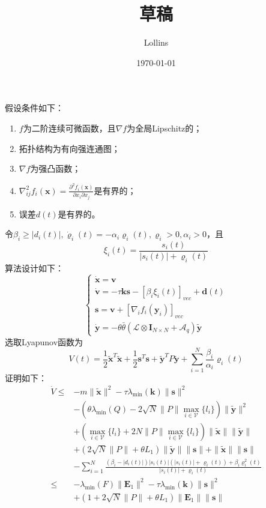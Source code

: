 \documentclass[12pt, a4paper, oneside]{ctexbook}
\title{{\Huge{\textbf{草稿}}}}
\author{Lollins}
\date{\today}
\begin{document}
\setcounter{page}{1}

\setcounter{page}{1}

假设条件如下：
\begin{enumerate}
    \item $f$为二阶连续可微函数，且$\nabla f$为全局Lipschitz的；
    \item 拓扑结构为有向强连通图；
    \item $\nabla f$为强凸函数；
    \item $\nabla_{ij}^{2}f_{i}(\mathbf{x})=\frac{\partial^{2}f_{i}(\mathbf{x})}{\partial x_{i}\partial x_{j}}$是有界的；
    \item 误差$d(t)$是有界的。
\end{enumerate}
令$\beta_i \geq | d_i(t) |, \dot{\varrho}_i(t) = -\alpha_i \varrho_i(t), \varrho_i > 0, \alpha_i > 0$，且
$$
\xi_i(t) = \frac{s_i(t)}{|s_i(t)| + \varrho_i(t)}
$$
算法设计如下：
$$
\begin{cases}
    \dot{\mathbf{x}}=\mathbf{v}\\
    \dot{\mathbf{v}}=-\tau\mathbf{k}\mathbf{s}-[\beta_i\xi_i(t)]_{vec}+\mathbf{d}(t)\\
    \mathbf{s}=\mathbf{v}+[\nabla_if_i(\mathbf{y}_i)]_{vec}\\
    \dot{\mathbf{y}}=-\theta\bar{\theta}(\mathcal{L}\otimes\mathbf{I}_{N\times N}+\mathcal{A}_q)\tilde{\mathbf{y}}
\end{cases}
$$
选取Lyapunov函数为
$$
V(t) = \frac{1}{2}\tilde{\mathbf{x}}^{T}\tilde{\mathbf{x}}+\frac{1}{2}\mathbf{s}^{T}\mathbf{s}+\tilde{\mathbf{y}}^{T}P\tilde{\mathbf{y}} + \sum_{i = 1}^{N} \frac{\beta_i}{\alpha_i}\varrho_i(t) 
$$
证明如下：
$$
\begin{aligned}
    \dot{V}\leq & -m\|\tilde{\mathbf{x}}\|^2-\tau\lambda_{\min}(\mathbf{k})\|\mathbf{s}\|^2  \\
    &-(\theta\lambda_{\min}(Q)-2\sqrt{N}\|P\|\max_{i\in\mathcal{V}}\{l_i\})\|\tilde{\mathbf{y}}\|^2 \\
    &+(\max_{i\in\mathcal{V}}\{l_i\}+2N\|P\|\max_{i\in\mathcal{V}}\{l_i\})\|\tilde{\mathbf{x}}\|\|\tilde{\mathbf{y}}\| \\
    &+(2\sqrt{N}\|P\|+\theta L_{1})\|\tilde{\mathbf{y}}\|\|\mathbf{s}\|+\|\tilde{\mathbf{x}}\|\|\mathbf{s}\|\\
    &-\sum_{i = 1}^{N}\frac{(\beta_i - |d_i(t)|)|s_i(t)|(|s_i(t)|+\varrho_i(t)) + \beta_i\varrho_i^2(t)}{|s_i(t)| + \varrho_i(t)}\\
    \leq &-\lambda_{\min}(F)\|\mathbf{E}_1\|^2-\tau\lambda_{\min}(\mathbf{k})\|\mathbf{s}\|^2\\
    &+(1+2\sqrt{N}\|P\|+\theta L_1)\|\mathbf{E}_1\|\|\mathbf{s}\|
    \end{aligned}
$$
\end{document}

